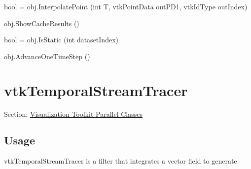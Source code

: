 \begin{DoxyItemize}
\item {\ttfamily bool = obj.\-Interpolate\-Point (int T, vtk\-Point\-Data out\-P\-D1, vtk\-Id\-Type out\-Index)}  
\item {\ttfamily obj.\-Show\-Cache\-Results ()}  
\item {\ttfamily bool = obj.\-Is\-Static (int dataset\-Index)}  
\item {\ttfamily obj.\-Advance\-One\-Time\-Step ()}  
\end{DoxyItemize}\hypertarget{vtkparallel_vtktemporalstreamtracer}{}\section{vtk\-Temporal\-Stream\-Tracer}\label{vtkparallel_vtktemporalstreamtracer}
Section\-: \hyperlink{sec_vtkparallel}{Visualization Toolkit Parallel Classes} \hypertarget{vtkwidgets_vtkxyplotwidget_Usage}{}\subsection{Usage}\label{vtkwidgets_vtkxyplotwidget_Usage}
vtk\-Temporal\-Stream\-Tracer is a filter that integrates a vector field to generate

